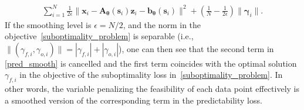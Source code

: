 \documentclass{article}
\theoremstyle{plain}
\begin{document}
\begin{align}
    \label{pred_smooth}
    \sum_{i = 1}^N \frac{1}{2\epsilon} \|\bm x_i - \bm A_{\bm\theta}(\bm s_i)\bm z_i- \bm b_{\bm\theta}(\bm s_i)\|^2 + \left(\frac{1}{N} - \frac{1}{2\epsilon}\right)\|\bm \gamma_{i}\|. 
\end{align}
If the smoothing level is $\epsilon = N/2$, and the norm in the objective~\eqref{suboptimality_problem} is separable (i.e., $\|(\gamma_{f,i},\gamma_{o,i})\| = |\gamma_{f,i}|+|\gamma_{o,i}|$), one can then see that the second term in \eqref{pred_smooth} is cancelled and the first term coincides with the optimal solution $\gamma_{f,i}$ in the objective of the suboptimality loss in~\eqref{suboptimality_problem}. In other words, the variable penalizing the feasibility of each data point effectively is a smoothed version of the corresponding term in the predictability loss. 
\end{document}
